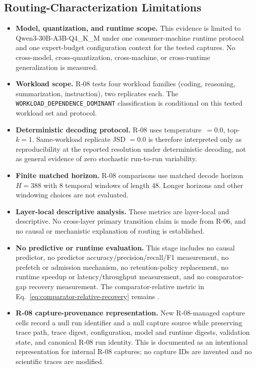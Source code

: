 \subsection*{Routing-Characterization Limitations}
\begin{itemize}
 \item \textbf{Model, quantization, and runtime scope.} This evidence is
   limited to Qwen3-30B-A3B-Q4\_K\_M under one consumer-machine runtime
   protocol and one expert-budget configuration context for the tested
   captures. No cross-model, cross-quantization, cross-machine, or
   cross-runtime generalization is measured.
 \item \textbf{Workload scope.} R-08 tests four workload families
   (coding, reasoning, summarization, instruction), two replicates each.
   The \texttt{WORKLOAD\_DEPENDENCE\_DOMINANT} classification is
   conditional on this tested workload set and protocol.
 \item \textbf{Deterministic decoding protocol.} R-08 uses
   temperature~$=0.0$, top-$k=1$. Same-workload replicate JSD $=0.0$ is
   therefore interpreted only as reproducibility at the reported
   resolution under deterministic decoding, not as general evidence of
   zero stochastic run-to-run variability.
 \item \textbf{Finite matched horizon.} R-08 comparisons use matched
   decode horizon $H=388$ with 8 temporal windows of length 48. Longer
   horizons and other windowing choices are not evaluated.
 \item \textbf{Layer-local descriptive analysis.} These metrics are
   layer-local and descriptive. No cross-layer primary transition claim is
   made from R-06, and no causal or mechanistic explanation of routing is
   established.
 \item \textbf{No predictive or runtime evaluation.} This stage includes no
   causal predictor, no predictor accuracy/precision/recall/F1 measurement,
   no prefetch or admission mechanism, no retention-policy replacement, no
   runtime speedup or latency/throughput measurement, and no
   comparator-gap recovery measurement. The comparator-relative metric in
   Eq.~\eqref{eq:comparator-relative-recovery} remains \notyetmeasured{}.
 \item \textbf{R-08 capture-provenance representation.} New R-08-managed
   capture cells record a null run identifier and a null capture source
   while preserving trace path, trace digest, configuration, model and
   runtime digests, validation state, and canonical R-08 run identity.
   This is documented as an intentional representation for internal R-08
   captures; no capture IDs are invented and no scientific traces are
   modified.
\end{itemize}

